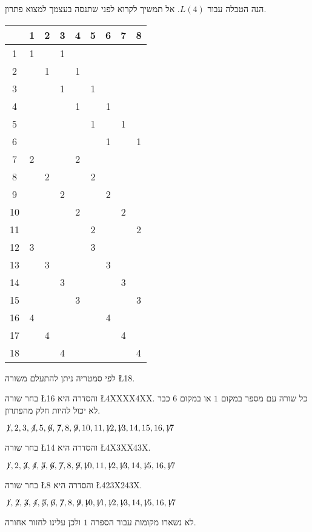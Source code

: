 הנה הטבלה עבור
$L(4)$.
אל תמשיך לקרוא לפני שתנסה בעצמך למצוא פתרון.
\begin{center}
\addtolength{\tabcolsep}{4pt}
\begin{tabular}{|c||c|c|c|c|c|c|c|c|}
\hline
&1&2&3&4&5&6&7&8\\\hline\hline
1&1&&1&&&&&\\\hline
2&&1&&1&&&&\\\hline
3&&&1&&1&&&\\\hline
4&&&&1&&1&&\\\hline
5&&&&&1&&1&\\\hline
6&&&&&&1&&1\\\hline
7&2&&&2&&&&\\\hline
8&&2&&&2&&&\\\hline
9&&&2&&&2&&\\\hline
10&&&&2&&&2&\\\hline
11&&&&&2&&&2\\\hline
12&3&&&&3&&&\\\hline
13&&3&&&&3&&\\\hline
14&&&3&&&&3&\\\hline
15&&&&3&&&&3\\\hline
16&4&&&&&4&&\\\hline
17&&4&&&&&4&\\\hline
18&&&4&&&&&4\\\hline
\end{tabular}
\end{center}
לפי סמטריה ניתן להתעלם משורה
\L{18}.

\noindent 
בחר שורה
\L{16}
והסדרה היא
\L{4XXXX4XX}.
כל שורה עם מספר במקום
$1$
או במקום
$6$
כבר לא יכול להיות חלק מהפתרון.

$\not\! 1,2,3,\not\! 4,5,\not\! 6,\not\! 7,8,\not\! 9,10,11,\not\!\! 12,\not\!\! 13,14,15,16,\not\!\! 17$

\noindent
בחר שורה
\L{14}
והסדרה היא
\L{4X3XX43X}.

$\not\! 1,2,\not\! 3,\not\! 4,\not\! 5,\not\! 6,\not\! 7,8,\not\! 9,\not\!\! 10,11,\not\!\! 12,\not\!\! 13,14, \not\!\! 15,16,\not\!\! 17$

\noindent
בחר שורה
\L{8}
והסדרה היא
\L{423X243X}.

$\not\! 1,\not\! 2,\not\! 3,\not\! 4,\not\! 5,\not\! 6,\not\! 7,8,\not\! 9,\not\!\! 10,\not\!\! 11,\not\!\! 12,\not\!\! 13,14, \not\!\! 15,16,\not\!\! 17$

\noindent
לא נשארו מקומות עבור הספרה $1$ ולכן עלינו לחזור אחורה.

\smallskip

